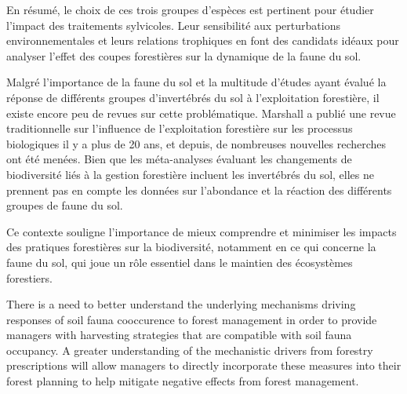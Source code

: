 En résumé, le choix de ces trois groupes d'espèces est pertinent pour étudier l'impact des traitements sylvicoles. 
Leur sensibilité aux perturbations environnementales et leurs relations trophiques en font des candidats idéaux pour analyser l'effet des coupes forestières sur la dynamique de la faune du sol.




Malgré l'importance de la faune du sol et la multitude d'études ayant évalué la réponse de différents groupes d'invertébrés du sol à l'exploitation forestière, il existe encore peu de revues sur cette problématique. 
Marshall a publié une revue traditionnelle sur l'influence de l'exploitation forestière sur les processus biologiques il y a plus de 20 ans, et depuis, de nombreuses nouvelles recherches ont été menées. 
Bien que les méta-analyses évaluant les changements de biodiversité liés à la gestion forestière incluent les invertébrés du sol, elles ne prennent pas en compte les données sur l'abondance et la réaction des différents groupes de faune du sol.




Ce contexte souligne l'importance de mieux comprendre et minimiser les impacts des pratiques forestières sur la biodiversité, notamment en ce qui concerne la faune du sol, qui joue un rôle essentiel dans le maintien des écosystèmes forestiers.



There is a need to better understand the underlying mechanisms driving responses of soil fauna cooccurence to forest management in order to provide managers with harvesting strategies that are compatible with soil fauna occupancy.
A greater understanding of the mechanistic drivers from forestry prescriptions will allow managers to directly incorporate these measures into their forest planning to help mitigate negative effects from forest management.

